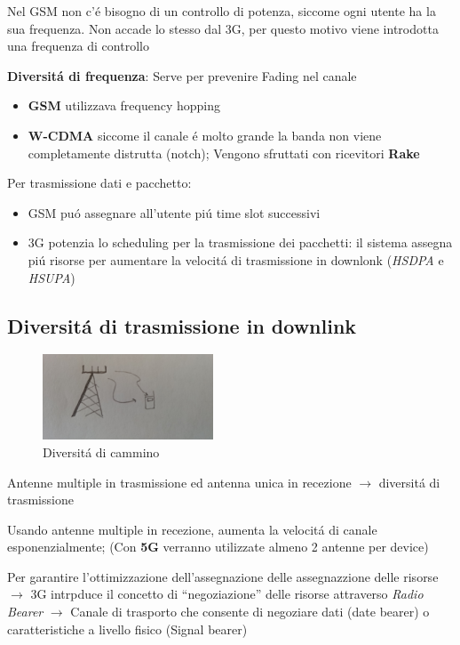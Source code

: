 \documentclass{article}
\begin{document}
Nel GSM non c'\'e bisogno di un controllo di potenza, siccome ogni utente ha la sua frequenza. Non accade lo stesso dal 3G, per questo motivo viene introdotta una frequenza di controllo

\textbf{Diversit\'a di frequenza}: Serve per prevenire Fading nel canale
\begin{itemize}
    \item \textbf{GSM} utilizzava frequency hopping
    \item \textbf{W-CDMA} siccome il canale \'e molto grande la banda non viene completamente distrutta (notch); Vengono sfruttati con ricevitori \textbf{Rake}
\end{itemize}

Per trasmissione dati e pacchetto:
\begin{itemize}
    \item GSM pu\'o assegnare all'utente pi\'u time slot successivi
    \item 3G potenzia lo scheduling per la trasmissione dei pacchetti: il sistema assegna pi\'u risorse per aumentare la velocit\'a di trasmissione in downlonk (\textit{HSDPA} e \textit{HSUPA})
\end{itemize}


\subsection{Diversit\'a di trasmissione in downlink}

\begin{figure}
    \includegraphics[width=2in]{img/diversi_cammini.jpg}
    \centering
    \caption{Diversit\'a di cammino}
\end{figure}
Antenne multiple in trasmissione ed antenna unica in recezione $\rightarrow$ diversit\'a di trasmissione

Usando antenne multiple in recezione, aumenta la velocit\'a di canale esponenzialmente; (Con \textbf{5G} verranno utilizzate almeno 2 antenne per device)


Per garantire l'ottimizzazione dell'assegnazione delle assegnazzione delle risorse $\rightarrow$ 3G intrpduce il concetto di ``negoziazione'' delle risorse attraverso \textit{Radio Bearer} $\rightarrow$ Canale di trasporto che consente  di negoziare dati (date bearer) o caratteristiche a livello fisico (Signal bearer)
\end{document}
